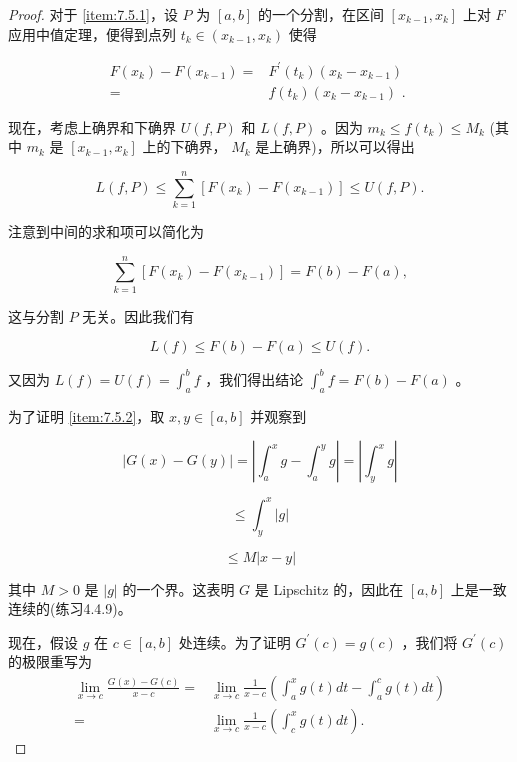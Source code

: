 \begin{proof}
对于 \ref{item:7.5.1}，设 \(P\) 为 \(\left\lbrack  {a,b}\right\rbrack\) 的一个分割，在区间 \(\left\lbrack  {{x}_{k - 1},{x}_{k}}\right\rbrack\) 上对 $F$ 应用中值定理，便得到点列 \({t}_{k} \in  \left( {{x}_{k - 1},{x}_{k}}\right)\) 使得

\begin{align*}
F\left( {x}_{k}\right)  - F\left( {x}_{k - 1}\right)  = & {F}^{\prime }\left( {t}_{k}\right) \left( {{x}_{k} - {x}_{k - 1}}\right)\\
= & f\left( {t}_{k}\right) \left( {{x}_{k} - {x}_{k - 1}}\right) \text{ . }
\end{align*}

现在，考虑上确界和下确界 \(U\left( {f,P}\right)\) 和 \(L\left( {f,P}\right)\) 。因为 \({m}_{k} \leq f\left( {t}_{k}\right)  \leq  {M}_{k}\) (其中 \({m}_{k}\) 是 \(\left\lbrack  {{x}_{k - 1},{x}_{k}}\right\rbrack\) 上的下确界， \({M}_{k}\) 是上确界)，所以可以得出

\[
L\left( {f,P}\right)  \leq  \mathop{\sum }\limits_{{k = 1}}^{n}\left\lbrack  {F\left( {x}_{k}\right)  - F\left( {x}_{k - 1}\right) }\right\rbrack   \leq  U\left( {f,P}\right) .
\]

注意到中间的求和项可以简化为

\[
\mathop{\sum }\limits_{{k = 1}}^{n}\left\lbrack  {F\left( {x}_{k}\right)  - F\left( {x}_{k - 1}\right) }\right\rbrack   = F\left( b\right)  - F\left( a\right) ,
\]

这与分割 \(P\) 无关。因此我们有

\[
L\left( f\right)  \leq  F\left( b\right)  - F\left( a\right)  \leq  U\left( f\right) .
\]

又因为 \(L\left( f\right)  = U\left( f\right)  = {\int }_{a}^{b}f\) ，我们得出结论 \({\int }_{a}^{b}f = F\left( b\right)  - F\left( a\right)\) 。

为了证明 \ref{item:7.5.2}，取 \(x,y \in  \left\lbrack  {a,b}\right\rbrack\) 并观察到

\[
\left| {G\left( x\right)  - G\left( y\right) }\right|  = \left| {{\int }_{a}^{x}g - {\int }_{a}^{y}g}\right|  = \left| {{\int }_{y}^{x}g}\right|
\]

\[
\leq  {\int }_{y}^{x}\left| g\right|
\]

\[
\leq  M\left| {x - y}\right|
\]

其中 \(M > 0\) 是 \(\left| g\right|\) 的一个界。这表明 \(G\) 是 Lipschitz 的，因此在 \(\left\lbrack  {a,b}\right\rbrack\) 上是一致连续的(练习4.4.9)。

现在，假设 \(g\) 在 \(c \in  \left\lbrack  {a,b}\right\rbrack\) 处连续。为了证明 \({G}^{\prime }\left( c\right)  = g\left( c\right)\) ，我们将 \({G}^{\prime }\left( c\right)\) 的极限重写为
\begin{align*}
\mathop{\lim }\limits_{{x \rightarrow  c}}\frac{G\left( x\right)  - G\left( c\right) }{x - c} = & \mathop{\lim }\limits_{{x \rightarrow  c}}\frac{1}{x - c}\left( {{\int }_{a}^{x}g\left( t\right) {dt} - {\int }_{a}^{c}g\left( t\right) {dt}}\right)\\
= & \mathop{\lim }\limits_{{x \rightarrow  c}}\frac{1}{x - c}\left( {{\int }_{c}^{x}g\left( t\right) {dt}}\right) .
\end{align*}


\end{proof}
